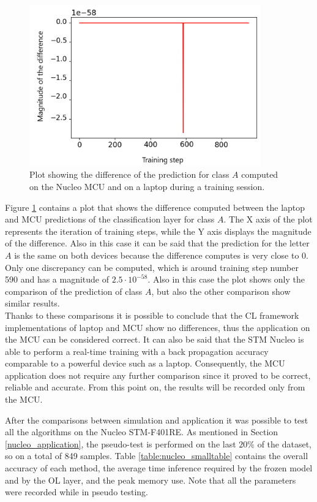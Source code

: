 \documentclass[12pt]{report}
\begin{document}
\begin{figure}[h!]
    \centering
    \includegraphics[width=100mm]{Figures/Chapter5/softmax_example.png} 
    \caption{Plot showing the difference of the prediction for class $A$ computed on the Nucleo MCU and on a laptop during a training session.}
    \label{fig:comparison_softmax}    
\end{figure}

Figure \ref{fig:comparison_softmax} contains a plot that shows the difference computed between the laptop and MCU predictions of the classification layer for class $A$. The X axis of the plot represents the iteration of training steps, while the Y axis displays the magnitude of the difference. Also in this case it can be said that the prediction for the letter $A$ is the same on both devices because the difference computes is very close to 0. Only one discrepancy can be computed, which is around training step number 590 and has a magnitude of $2.5 \cdot 10^{-58}$. Also in this case the plot shows only the comparison of the prediction of class $A$, but also the other comparison show similar results.\\
Thanks to these comparisons it is possible to conclude that the CL framework implementations of laptop and MCU show no differences, thus the application on the MCU can be considered correct. It can also be said that the STM Nucleo is able to perform a real-time training with a back propagation accuracy comparable to a powerful device such as a laptop. Consequently, the MCU application does not require any further comparison since it proved to be correct, reliable and accurate. From this point on, the results will be recorded only from the MCU.\bigskip

After the comparisons between simulation and application it was possible to test all the algorithms on the Nucleo STM-F401RE. As mentioned in Section \ref{nucleo_application}, the pseudo-test is performed on the last $20\%$ of the dataset, so on a total of 849 samples. Table \ref{table:nucleo_smalltable} contains the overall accuracy of each method, the average time inference required by the frozen model and by the OL layer, and the peak memory use. Note that all the parameters were recorded while in pseudo testing. \\
\end{document}
